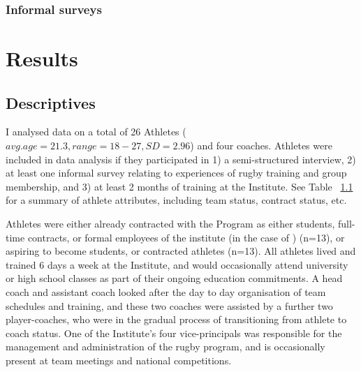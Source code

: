 \subsubsection{Informal surveys}

























\section{Results}


\subsection{Descriptives}
I analysed data on a total of 26 Athletes ($avg. age = 21.3, range = 18-27, SD = 2.96$) and four coaches.  Athletes were included in data analysis if they participated in 1) a semi-structured interview, 2) at least one informal survey relating to experiences of rugby training and group membership, and 3) at least 2 months of training at the Institute.  See Table ~\ref{} for a summary of athlete attributes, including team status, contract status, etc.

Athletes were either already contracted with the Program as either students, full-time contracts, or formal employees of the institute (in the case of ) (n=13), or aspiring to become students, or contracted athletes (n=13).  All athletes lived and trained 6 days a week at the Institute, and would occasionally attend university or high school classes as part of their ongoing education commitments.  A head coach and assistant coach looked after the day to day organisation of team schedules and training, and these two coaches were assisted by a further two player-coaches, who were in the gradual process of transitioning from athlete to coach status.  One of the Institute's four vice-principals was responsible for the management and administration of the rugby program, and is occasionally present at team meetings and national competitions.

